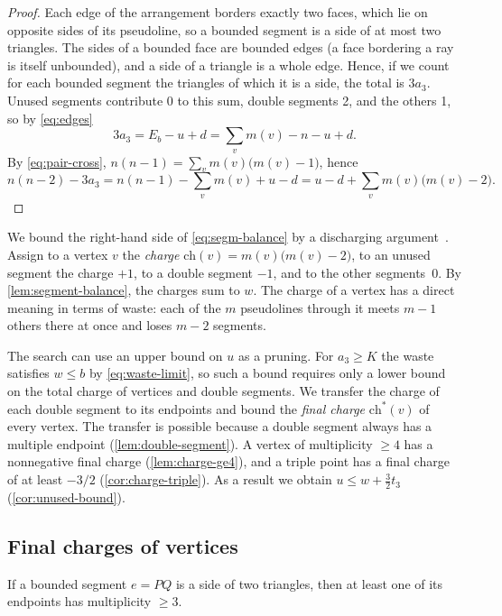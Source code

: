 \begin{proof}
Each edge of the arrangement borders exactly two faces, which lie on opposite sides of its pseudoline, so a bounded segment is a side of at most two triangles.
The sides of a bounded face are bounded edges (a face bordering a ray is itself unbounded), and a side of a triangle is a whole edge.
Hence, if we count for each bounded segment the triangles of which it is a side, the total is $3a_3$.
Unused segments contribute 0 to this sum, double segments 2, and the others 1, so by \eqref{eq:edges}
\[
3a_3=E_b-u+d=\sum_v m(v)-n-u+d.
\]
By \eqref{eq:pair-cross}, $n(n-1)=\sum_v m(v)\bigl(m(v)-1\bigr)$, hence
\[
n(n-2)-3a_3=n(n-1)-\sum_v m(v)+u-d=u-d+\sum_v m(v)\bigl(m(v)-2\bigr).
\]
\end{proof}

We bound the right-hand side of \eqref{eq:segm-balance} by a discharging argument~\cite{cw17}.
Assign to a vertex $v$ the \emph{charge} $\mathrm{ch}(v)=m(v)\bigl(m(v)-2\bigr)$, to an unused segment the charge $+1$, to a double segment $-1$, and to the other segments~0.
By \cref{lem:segment-balance}, the charges sum to $w$.
The charge of a vertex has a direct meaning in terms of waste: each of the $m$ pseudolines through it meets $m-1$ others there at once and loses $m-2$ segments.

The search can use an upper bound on $u$ as a pruning.
For $a_3\ge K$ the waste satisfies $w\le b$ by \eqref{eq:waste-limit}, so such a bound requires only a lower bound on the total charge of vertices and double segments.
We transfer the charge of each double segment to its endpoints and bound the \emph{final charge} $\mathrm{ch}^*(v)$ of every vertex.
The transfer is possible because a double segment always has a multiple endpoint (\cref{lem:double-segment}).
A vertex of multiplicity $\ge4$ has a nonnegative final charge (\cref{lem:charge-ge4}), and a triple point has a final charge of at least $-3/2$ (\cref{cor:charge-triple}).
As a result we obtain $u\le w+\tfrac32t_3$ (\cref{cor:unused-bound}).

\subsection{Final charges of vertices}

\begin{lemma}\label{lem:double-segment}
If a bounded segment $e=PQ$ is a side of two triangles, then at least one of its endpoints has multiplicity $\ge3$.
\end{lemma}

